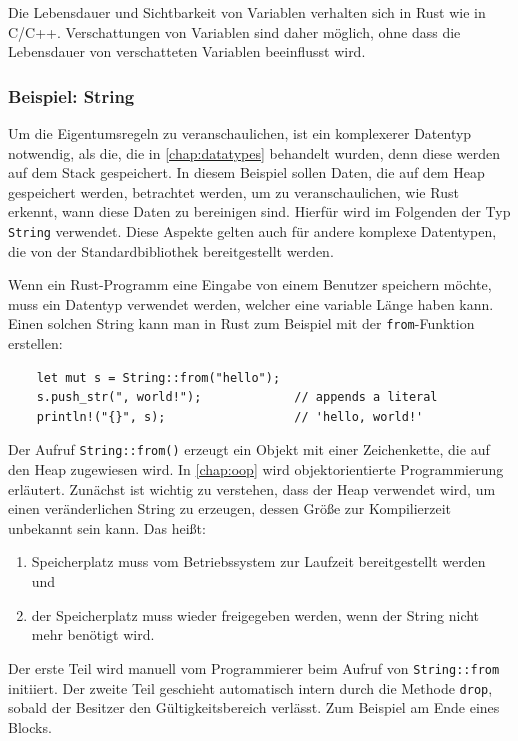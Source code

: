 Die Lebensdauer und Sichtbarkeit von Variablen verhalten sich in Rust wie in C/C++. Verschattungen von Variablen sind daher möglich, ohne dass die Lebensdauer von verschatteten Variablen beeinflusst wird.

\subsubsection{Beispiel: String}

Um die Eigentumsregeln zu veranschaulichen, ist ein komplexerer Datentyp not\-wen\-dig, als die, die in \autoref{chap:datatypes} behandelt wurden, denn diese werden auf dem Stack gespeichert. In diesem Beispiel sollen Daten, die auf dem Heap gespeichert werden, betrachtet werden, um zu veranschaulichen, wie Rust erkennt, wann diese Daten zu bereinigen sind. Hierfür wird im Folgenden der Typ \verb"String" verwendet. Diese Aspekte gelten auch für andere komplexe Datentypen, die von der Standardbibliothek bereitgestellt werden.

Wenn ein Rust-Programm eine Eingabe von einem Benutzer speichern möchte, muss ein Datentyp verwendet werden, welcher eine variable Länge haben kann. Einen solchen String kann man in Rust zum Beispiel mit der \verb"from"-Funktion erstellen:

\begin{lstlisting}
    let mut s = String::from("hello");
    s.push_str(", world!");             // appends a literal
    println!("{}", s);                  // 'hello, world!'
\end{lstlisting}

Der Aufruf \verb"String::from()" erzeugt ein Objekt mit einer Zeichenkette, die auf den Heap zugewiesen wird. In \autoref{chap:oop} wird objektorientierte Programmier\-ung erläutert. Zunächst ist wichtig zu verstehen, dass der Heap verwendet wird, um einen veränderlichen String zu erzeugen, dessen Größe zur Kompilierzeit unbekannt sein kann. Das heißt:

\begin{enumerate}
    \item Speicherplatz muss vom Betriebssystem zur Laufzeit bereitgestellt werden und
    \item der Speicherplatz muss wieder freigegeben werden, wenn der String nicht mehr benötigt wird.
\end{enumerate}

Der erste Teil wird manuell vom Programmierer beim Aufruf von \verb"String::from" initiiert. Der zweite Teil geschieht automatisch intern durch die Methode \verb"drop", sobald der Besitzer den Gültigkeitsbereich verlässt. Zum Beispiel am Ende eines Blocks.

